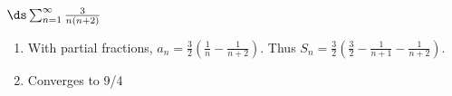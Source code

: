 {$\ds \sum_{n=1}^\infty \frac{3}{n(n+2)}$
}
{\begin{enumerate}
\item		With partial fractions, $a_n = \frac32\left(\frac1n-\frac1{n+2}\right)$. Thus $S_n = \frac32\left(\frac32-\frac1{n+1}-\frac1{n+2}\right)$.
\item		Converges to 9/4
\end{enumerate}
}